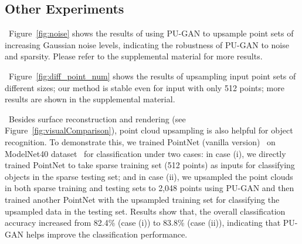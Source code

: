 

\subsection{Other Experiments}


 \
Figure~\ref{fig:noise} shows the results of using PU-GAN to upsample point sets of increasing Gaussian noise levels, indicating the robustness of PU-GAN to noise and sparsity.
Please refer to the supplemental material for more results.

 \
Figure~\ref{fig:diff_point_num} shows the results of upsampling input point sets of different sizes; our method is stable even for input with only 512 points; more results are shown in the supplemental material.

\para{Applications.} \
Besides surface reconstruction and rendering (see Figure~\ref{fig:visualComparison}), point cloud upsampling is also helpful for object recognition.
To demonstrate this, we trained PointNet (vanilla version)~\cite{qi2016pointnet} on ModelNet40 dataset~\cite{wu20153d} for classification under two cases:
in case (i), we directly trained PointNet to take sparse training set (512 points) as inputs for classifying objects in the sparse testing set;
and in case (ii), we upsampled the point clouds in both sparse training and testing sets to 2,048 points using PU-GAN and then trained another PointNet with the upsampled training set for classifying the upsampled data in the testing set.
Results show that, the overall classification accuracy increased from 82.4\% (case (i)) to 83.8\% (case (ii)), indicating that PU-GAN helps improve the classification performance.


